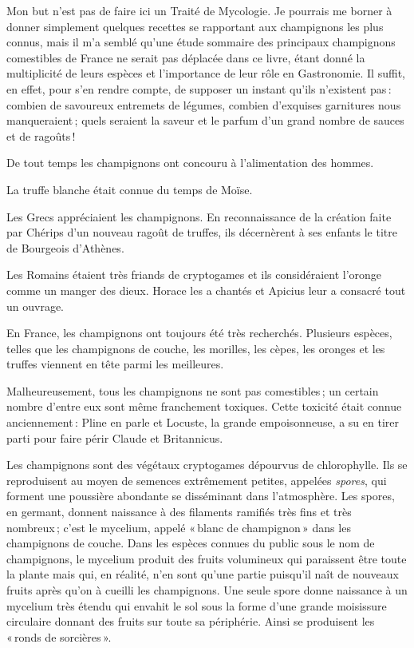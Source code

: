 Mon but n'est pas de faire ici un Traité de Mycologie. Je pourrais me borner
à donner simplement quelques recettes se rapportant aux champignons les plus
connus, mais il m'a semblé qu'une étude sommaire des principaux champignons
comestibles de France ne serait pas déplacée dans ce livre, étant donné la
multiplicité de leurs espèces et l'importance de leur rôle en Gastronomie. Il
suffit, en effet, pour s'en rendre compte, de supposer un instant qu'ils
n'existent pas : combien de savoureux entremets de légumes, combien d'exquises
garnitures nous manqueraient ; quels seraient la saveur et le parfum d'un grand
nombre de sauces et de ragoûts !

De tout temps les champignons ont concouru à l'alimentation des hommes.

La truffe blanche était connue du temps de Moïse.

Les Grecs appréciaient les champignons. En reconnaissance de la création faite
par Chérips d'un nouveau ragoût de truffes, ils décernèrent à ses enfants le titre
de Bourgeois d'Athènes.

Les Romains étaient très friands de cryptogames et ils considéraient l'oronge
comme un manger des dieux. Horace les a chantés et Apicius leur a consacré tout
un ouvrage.

En France, les champignons ont toujours été très recherchés. Plusieurs espèces,
telles que les champignons de couche, les morilles, les cèpes, les oronges et
les truffes viennent en tête parmi les meilleures.

Malheureusement, tous les champignons ne sont pas comestibles ; un certain
nombre d’entre eux sont même franchement toxiques. Cette toxicité était connue
anciennement : Pline en parle et Locuste, la grande empoisonneuse, a su en
tirer parti pour faire périr Claude et Britannicus.

\medskip

Les champignons sont des végétaux cryptogames dépourvus de chlorophylle. Ils se
reproduisent au moyen de semences extrêmement petites, appelées
\textit{spores}, qui forment une poussière abondante se disséminant dans
l'atmosphère. Les spores, en germant, donnent naissance à des filaments
ramifiés très fins et très nombreux ; c'est le mycelium, appelé « blanc de
champignon » dans les champignons de couche. Dans les espèces connues du public
sous le nom de champignons, le mycelium produit des fruits volumineux qui
paraissent être toute la plante mais qui, en réalité, n'en sont qu'une partie
puisqu'il naît de nouveaux fruits après qu'on à cueilli les champignons. Une
seule spore donne naissance à un mycelium très étendu qui envahit le sol sous
la forme d'une grande moisissure circulaire donnant des fruits sur toute sa
périphérie. Ainsi se produisent les « ronds de sorcières ».


